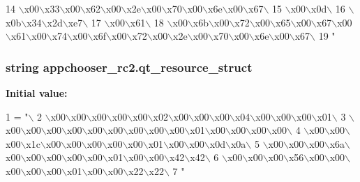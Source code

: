 \begin{DoxyCode}
14 \textcolor{stringliteral}{\(\backslash\)x00\(\backslash\)x33\(\backslash\)x00\(\backslash\)x62\(\backslash\)x00\(\backslash\)x2e\(\backslash\)x00\(\backslash\)x70\(\backslash\)x00\(\backslash\)x6e\(\backslash\)x00\(\backslash\)x67\(\backslash\)}
15 \textcolor{stringliteral}{\(\backslash\)x00\(\backslash\)x0d\(\backslash\)}
16 \textcolor{stringliteral}{\(\backslash\)x0b\(\backslash\)x34\(\backslash\)x2d\(\backslash\)xe7\(\backslash\)}
17 \textcolor{stringliteral}{\(\backslash\)x00\(\backslash\)x61\(\backslash\)}
18 \textcolor{stringliteral}{\(\backslash\)x00\(\backslash\)x6b\(\backslash\)x00\(\backslash\)x72\(\backslash\)x00\(\backslash\)x65\(\backslash\)x00\(\backslash\)x67\(\backslash\)x00\(\backslash\)x61\(\backslash\)x00\(\backslash\)x74\(\backslash\)x00\(\backslash\)x6f\(\backslash\)x00\(\backslash\)x72\(\backslash\)x00\(\backslash\)x2e\(\backslash\)x00\(\backslash\)x70\(\backslash\)x00\(\backslash\)x6e\(\backslash\)x00\(\backslash\)x67\(\backslash\)}
19 \textcolor{stringliteral}{"}
\end{DoxyCode}
\hypertarget{namespaceappchooser__rc2_a84b274950f81fda3d5b90cd1a7d429f7}{}
\subsubsection[{qt\+\_\+resource\+\_\+struct}]{\setlength{\rightskip}{0pt plus 5cm}string appchooser\+\_\+rc2.\+qt\+\_\+resource\+\_\+struct}\label{namespaceappchooser__rc2_a84b274950f81fda3d5b90cd1a7d429f7}
{\bfseries Initial value\+:}
\begin{DoxyCode}
1 = \textcolor{stringliteral}{"\(\backslash\)}
2 \textcolor{stringliteral}{\(\backslash\)x00\(\backslash\)x00\(\backslash\)x00\(\backslash\)x00\(\backslash\)x00\(\backslash\)x02\(\backslash\)x00\(\backslash\)x00\(\backslash\)x00\(\backslash\)x04\(\backslash\)x00\(\backslash\)x00\(\backslash\)x00\(\backslash\)x01\(\backslash\)}
3 \textcolor{stringliteral}{\(\backslash\)x00\(\backslash\)x00\(\backslash\)x00\(\backslash\)x00\(\backslash\)x00\(\backslash\)x00\(\backslash\)x00\(\backslash\)x00\(\backslash\)x00\(\backslash\)x01\(\backslash\)x00\(\backslash\)x00\(\backslash\)x00\(\backslash\)x00\(\backslash\)}
4 \textcolor{stringliteral}{\(\backslash\)x00\(\backslash\)x00\(\backslash\)x00\(\backslash\)x1c\(\backslash\)x00\(\backslash\)x00\(\backslash\)x00\(\backslash\)x00\(\backslash\)x00\(\backslash\)x01\(\backslash\)x00\(\backslash\)x00\(\backslash\)x0d\(\backslash\)x0a\(\backslash\)}
5 \textcolor{stringliteral}{\(\backslash\)x00\(\backslash\)x00\(\backslash\)x00\(\backslash\)x6a\(\backslash\)x00\(\backslash\)x00\(\backslash\)x00\(\backslash\)x00\(\backslash\)x00\(\backslash\)x01\(\backslash\)x00\(\backslash\)x00\(\backslash\)x42\(\backslash\)x42\(\backslash\)}
6 \textcolor{stringliteral}{\(\backslash\)x00\(\backslash\)x00\(\backslash\)x00\(\backslash\)x56\(\backslash\)x00\(\backslash\)x00\(\backslash\)x00\(\backslash\)x00\(\backslash\)x00\(\backslash\)x01\(\backslash\)x00\(\backslash\)x00\(\backslash\)x22\(\backslash\)x22\(\backslash\)}
7 \textcolor{stringliteral}{"}
\end{DoxyCode}
